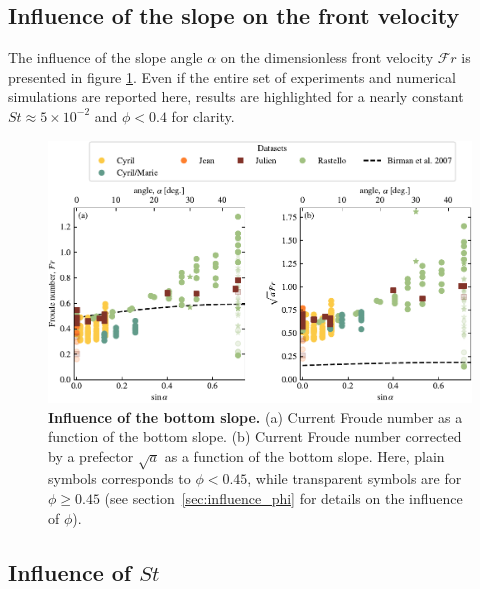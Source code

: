 \documentclass[twocolumn]{article}
\begin{document}
\subsection{Influence of the slope on the front velocity}

The influence of the slope angle $\alpha$ on the dimensionless front velocity $\mathcal{F}r$ is presented in figure \ref{fig:fig4}. Even if the entire set of experiments and numerical simulations are reported here, results are highlighted for a nearly constant $St\approx 5\times 10^{-2}$ and $\phi < 0.4$ for clarity.

\begin{figure}
	\centering
	\includegraphics{figure4.pdf}
	\caption{\textbf{Influence of the bottom slope.} (a) Current Froude number as a function of the bottom slope. (b) Current Froude number corrected by a prefector $\sqrt{a}$ as a function of the bottom slope. Here, plain symbols corresponds to $\phi < 0.45$, while transparent symbols are for $\phi \geq 0.45$ (see section~\ref{sec:influence_phi} for details on the influence of $\phi$).}
	\label{fig:fig4}
\end{figure}

\subsection{Influence of $St$}
\end{document}
